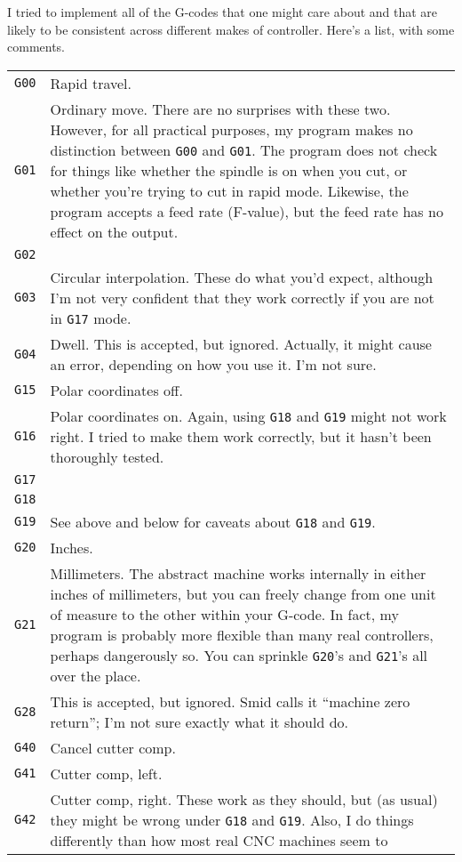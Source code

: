 \documentclass[titlepage,oneside,10pt]{article}
\begin{document}
I tried to implement all of the G-codes that one might care about and
that are likely to be consistent across different makes of
controller. Here's a list, with some comments.
\vskip 0.25cm
\begin{longtable}{lp{10cm}}
{\tt G00}&Rapid travel.\\
{\tt G01}&Ordinary move. There are no surprises with these
two. However, for all practical purposes, my program makes no
distinction between {\tt G00} and {\tt G01}. The program does not
check for things like whether the spindle is  on when you cut, or
whether you're trying to cut in rapid mode. Likewise, the program
accepts a feed rate (F-value), but the feed rate has no effect on the
output. \\
{\tt G02}&\\
{\tt G03}&Circular interpolation. These do what you'd expect,
although I'm not very confident that they work correctly if you are not
in {\tt G17} mode.\\
{\tt G04}&Dwell. This is accepted, but ignored. Actually, it might
cause an error, depending on how you use it. I'm not sure.\\
{\tt G15}&Polar coordinates off.\\
{\tt G16}&Polar coordinates on. Again, using {\tt G18} and {\tt G19}
might not work right. I tried to make them work correctly, but it
hasn't been thoroughly tested.\\
{\tt G17}&\\
{\tt G18}&\\
{\tt G19}&See above and below for caveats about {\tt G18} and {\tt G19}.\\
{\tt G20}&Inches.\\
{\tt G21}&Millimeters. The abstract machine works internally in either
inches of millimeters, but you can freely change from one unit of
measure to the other within your G-code. In fact, my program is
probably more flexible than many real controllers, perhaps dangerously
so. You can sprinkle {\tt G20}'s and {\tt G21}'s all over the place.\\ 
{\tt G28}&This is accepted, but ignored. Smid calls it ``machine zero
return''; I'm not sure exactly what it should do.\\
{\tt G40}&Cancel cutter comp.\\
{\tt G41}&Cutter comp, left.\\
{\tt G42}&Cutter comp, right. These work as they should, but (as
usual) they might be wrong under {\tt G18} and {\tt G19}. Also, I do
things differently than how most real CNC machines seem to

\end{longtable}
\end{document}
